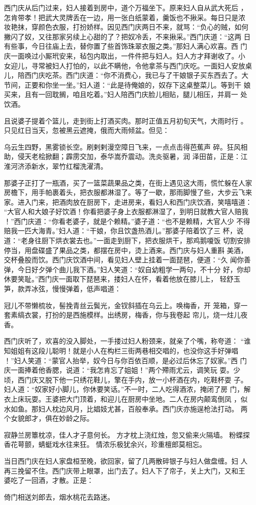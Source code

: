 西门庆从后门过来，妇人接着到房中，道个万福坐下。原来妇人自从武大死后
，怎肯带孝！把武大灵牌丢在一边，用一张白纸蒙着，羹饭也不揪采。每日只是浓
妆艳抹，穿颜色衣服，打扮娇样。因见西门庆两日不来，就骂：“负心的贼，如何
撇闪了奴，又往那家另续上心甜的了？把奴冷丢，不来揪采。”西门庆道：“这两
日有些事，今日往庙上去，替你置了些首饰珠翠衣服之类。”那妇人满心欢喜。西
门庆一面唤过小厮玳安来，毡包内取出，一件件把与妇人。妇人方才拜谢收了。小
女迎儿，寻常被妇人打怕的，以此不瞒他，令他拿茶与西门庆吃。一面妇人安放桌
儿，陪西门庆吃茶。西门庆道：“你不消费心，我已与了干娘银子买东西去了。大
节间，正要和你坐一坐。”妇人道：“此是待俺娘的，奴存下这桌整菜儿。等到干
娘买来，且有一回耽搁，咱且吃着。”妇人陪西门庆脸儿相贴，腿儿相压，并肩一
处饮酒。

且说婆子提着个篮儿，走到街上打酒买肉。那时正值五月初旬天气，大雨时行
。只见红日当天，忽被黑云遮掩，俄而大雨倾盆。但见：

乌云生四野，黑雾锁长空。刷剌剌漫空障日飞来，一点点击得芭蕉声
碎。狂风相助，侵天老桧掀翻；霹雳交加，泰华嵩乔震动。洗炎驱暑，润
泽田苗，正是：江淮河济添新水，翠竹红榴洗濯清。

那婆子正打了一瓶酒，买了一篮菜蔬果品之类，在街上遇见这大雨，慌忙躲在人家
房檐下，用手帕裹着头，把衣服都淋湿了。等了一歇，那雨脚慢了些，大步云飞来
家。进入门来，把酒肉放在厨房下，走进房来，看妇人和西门庆饮酒，笑嘻嘻道：
“大官人和大娘子好饮酒！你看把婆子身上衣服都淋湿了，到明日就教大官人赔我
！”西门庆道：“你看老婆子，就是个赖精。”婆子道：“也不是赖精，大官人少
不得赔我一匹大海青。”妇人道：“干娘，你且饮盏热酒儿。”那婆子陪着饮了三
杯，说道：“老身往厨下烘衣裳去也。”一面走到厨下，把衣服烘干，那鸡鹅嗄饭
切割安排停当，用盘碟盛了果品之类，都摆在房中，烫上酒来。西门庆与妇人重斟
美酒，交杯叠股而饮。西门庆饮酒中间，看见妇人壁上挂着一面琵琶，便道：“久
闻你善弹，今日好夕弹个曲儿我下酒。”妇人笑道：“奴自幼粗学一两句，不十分
好，你却休要笑耻。”西门庆一面取下琵琶来，搂妇人在怀，看着他放在膝儿上，
轻舒玉笋，款弄冰弦，慢慢弹着，低声唱道：

冠儿不带懒梳妆，髻挽青丝云鬓光，金钗斜插在乌云上。唤梅香，开
笼箱，穿一套素缟衣裳，打扮的是西施模样。出绣房，梅香，你与我卷起
帘儿，烧一炷儿夜香。

西门庆听了，欢喜的没入脚处，一手搂过妇人粉颈来，就亲了个嘴，称夸道：
“谁知姐姐有这段儿聪明！就是小人在构栏三街两巷相交唱的，也没你这手好弹唱
！”妇人笑道：“蒙官人抬举，奴今日与你百依百顺，是必过后休忘了奴家。”西
门庆一面捧着他香腮，说道：“我怎肯忘了姐姐！”两个殢雨尤云，调笑玩
耍。少顷，西门庆又脱下他一只绣花鞋儿，擎在手内，放一小杯酒在内，吃鞋杯耍
子。妇人道：“奴家好小脚儿，你休要笑话。”不一时，二人吃得酒浓，掩闭了房
门，解衣上床玩耍。王婆把大门顶着，和迎儿在厨房中坐地。二人在房内颠鸾倒凤
，似水如鱼。那妇人枕边风月，比娼妓尤甚，百般奉承。西门庆亦施逞枪法打动。
两个女貌郎才，俱在妙龄之际。

寂静兰房簟枕凉，佳人才子意何长。
方才枕上浇红烛，忽又偷来火隔墙。
粉蝶探香花萼颤，蜻蜓戏水往来狂。
情浓乐极犹余兴，珍重檀郎莫相忘。

当日西门庆在妇人家盘桓至晚，欲回家，留了几两散碎银子与妇人做盘缠。妇
人再三挽留不住。西门庆带上眼罩，出门去了。妇人下了帘子，关上大门，又和王
婆吃了一回酒，才散。正是：

倚门相送刘郎去，烟水桃花去路迷。